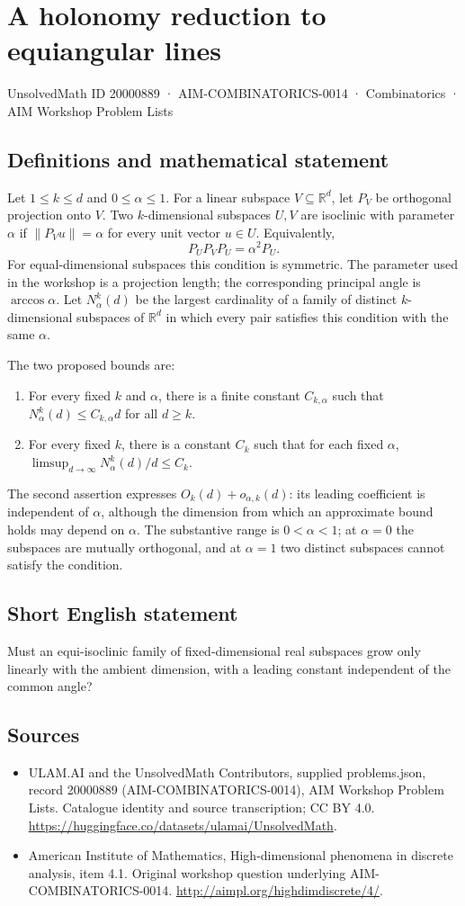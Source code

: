 \documentclass[11pt,a4paper]{article}
\begin{document}
\section*{A holonomy reduction to equiangular lines}\label{20000889}
{\small UnsolvedMath ID 20000889 · AIM-COMBINATORICS-0014 · Combinatorics · AIM Workshop Problem Lists}
\subsection{Definitions and mathematical statement}
Let $1\le k\le d$ and $0\le\alpha\le1$. For a linear subspace
$V\subseteq\mathbb R^d$, let $P_V$ be orthogonal projection onto $V$.
Two $k$-dimensional subspaces $U,V$ are isoclinic with parameter $\alpha$
if $\|P_Vu\|=\alpha$ for every unit vector $u\in U$. Equivalently,
\[
                P_UP_VP_U=\alpha^2P_U.
\]
For equal-dimensional subspaces this condition is symmetric. The
parameter used in the workshop is a projection length; the corresponding
principal angle is $\arccos\alpha$.
Let $N_\alpha^k(d)$ be the largest cardinality of a family of distinct
$k$-dimensional subspaces of $\mathbb R^d$ in which every pair satisfies
this condition with the same $\alpha$.

The two proposed bounds are:
\begin{enumerate}
\item For every fixed $k$ and $\alpha$, there is a finite constant
$C_{k,\alpha}$ such that $N_\alpha^k(d)\le C_{k,\alpha}d$ for all $d\ge k$.
\item For every fixed $k$, there is a constant $C_k$ such that for each
fixed $\alpha$,
$\limsup_{d\to\infty}N_\alpha^k(d)/d\le C_k$.
\end{enumerate}
The second assertion expresses $O_k(d)+o_{\alpha,k}(d)$: its leading
coefficient is independent of $\alpha$, although the dimension from which
an approximate bound holds may depend on $\alpha$. The substantive range
is $0<\alpha<1$; at $\alpha=0$ the subspaces are mutually orthogonal,
and at $\alpha=1$ two distinct subspaces cannot satisfy the condition.
\subsection{Short English statement}
Must an equi-isoclinic family of fixed-dimensional real subspaces grow only linearly with the ambient dimension, with a leading constant independent of the common angle?
\subsection{Sources}
\begin{itemize}
\item[S1] ULAM.AI and the UnsolvedMath Contributors, supplied problems.json, record 20000889 (AIM-COMBINATORICS-0014), AIM Workshop Problem Lists. Catalogue identity and source transcription; CC BY 4.0.
\url{https://huggingface.co/datasets/ulamai/UnsolvedMath}.
\item[S2] American Institute of Mathematics, High-dimensional phenomena in discrete analysis, item 4.1. Original workshop question underlying AIM-COMBINATORICS-0014.
\url{http://aimpl.org/highdimdiscrete/4/}.
\end{itemize}
\end{document}
